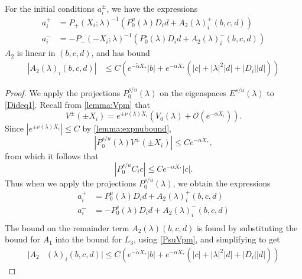 \documentclass[thesis.tex]{subfiles}
\begin{document}
\begin{lemma}\label{lemma:aipm}
For the initial conditions $a_i^\pm$, we have the expressions
\begin{equation}\label{aipmexp1}
\begin{aligned}
a_i^+ &= P_+(X_i; \lambda)^{-1} \left( P_0^u(\lambda) D_i d + A_2(\lambda)_i^+(b, c, d) \right) \\
a_i^- &= -P_-(-X_i; \lambda)^{-1} \left( P_0^s(\lambda) D_i d + A_2(\lambda)_i^-(b, c, d) \right)
\end{aligned}
\end{equation}
$A_2$ is linear in $(b, c, d)$, and has bound
\begin{align}
|A_2(\lambda)_i(b, c, d)|
&\leq C \left(e^{-\tilde{\alpha} X_*}|b| + e^{-\alpha X_*}(|c| + |\lambda|^2|d| + |D_i||d|) \right) \label{A2bound}
\end{align}

\begin{proof}
We apply the projections $P_0^{s/u}(\lambda)$ on the eigenspaces $E^{s/u}(\lambda)$ to \eqref{Dideq1}. Recall from \cref{lemma:Vpm} that
\begin{equation}\label{Vpmestimate}
V^\pm(\pm X_i) = e^{\pm \nu(\lambda)X_i}\left( V_0(\lambda) + \mathcal{O}(e^{-\alpha X_i}) \right).
\end{equation}
Since $|e^{\pm \nu(\lambda)X_i}|\leq C$ by \cref{lemma:expnubound}, 
\[
|P_0^{s/u}(\lambda)V^\pm(\pm X_i)| \leq C e^{-\alpha X_*},
\]
from which it follows that
\begin{equation}\label{PsuVpm}
|P_0^{s/u} C_i c| \leq C e^{-\alpha X_*} |c|.
\end{equation}
Thus when we apply the projections $P_0^{s/u}(\lambda)$, we obtain the expressions
\begin{align*}
a_i^+ &= P_0^u(\lambda) D_i d + A_2(\lambda)_i^+(b, c, d) \\
a_i^- &= -P_0^s(\lambda) D_i d + A_2(\lambda)_i^-(b, c, d) \\
\end{align*}
The bound on the remainder term $A_2(\lambda)(b, c, d)$ is found by substituting the bound for $A_1$ into the bound for $L_3$, using \cref{PsuVpm}, and simplifying to get
\begin{align*}
|A_2&(\lambda)_i(b, c, d)| \leq C \left(e^{-\tilde{\alpha} X_*}|b| + e^{-\alpha X_*}(|c| + |\lambda|^2|d| + |D_i||d|) \right)
\end{align*} 


\end{proof}
\end{lemma}
\end{document}
